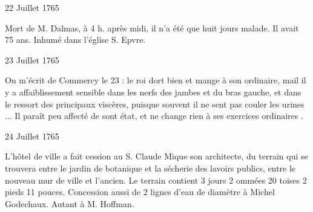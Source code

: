                      \begin{diary}{22 Juillet 1765}{}

                         Mort de M. Dalmas, à 4 h. après midi,
                           il n'a été que huit jours malade.
                           Il avait 75 ans. Inhumé dans l’église S. Epvre. \bigskip


                     \end{diary}

                     \begin{diary}{23 Juillet 1765}{}

                         On m'écrit de Commercy
                           le 23 : \og le roi
                              dort bien et mange à son ordinaire, mail il
                              y a affaiblissement sensible dans les nerfs des
                              jambes et du bras gauche, et dans le ressort des
                              principaux viscères, puisque souvent il ne
                              sent pas couler les urines ... Il paraît peu
                              affecté de sont état, et ne change rien à
                              ses exercices ordinaires \fg{}. \bigskip


                     \end{diary}

                     \begin{diary}{24 Juillet 1765}{}


                           L'hôtel de ville a fait cession au
                              S. Claude
                              Mique son architecte, du terrain qui
                           se trouvera entre le jardin de
                              botanique
                           et la sécherie des lavoirs
                              publics, entre le
                           nouveau mur de ville et l'ancien. Le terrain
                           contient 3 jours 2 ommées 20 toises 2 pieds 11 pouces.
                           Concession aussi de 2 lignes d'eau de diamètre
                           à Michel Godechaux. Autant à
                              M. Hoffman. \bigskip


                     \end{diary}

